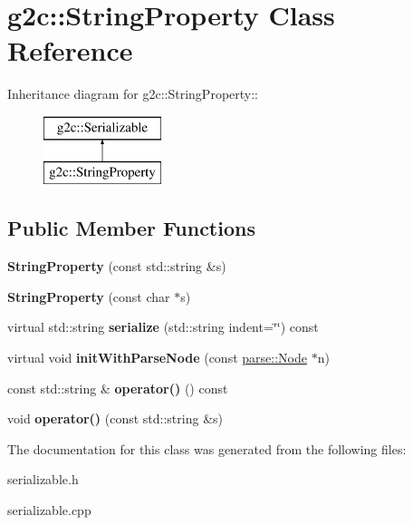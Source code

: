 \hypertarget{classg2c_1_1_string_property}{
\section{g2c::StringProperty Class Reference}
\label{classg2c_1_1_string_property}
}
Inheritance diagram for g2c::StringProperty::\begin{figure}[H]
\begin{center}
\leavevmode
\includegraphics[height=2cm]{classg2c_1_1_string_property}
\end{center}
\end{figure}
\subsection*{Public Member Functions}
\begin{DoxyCompactItemize}
\item 
\hypertarget{classg2c_1_1_string_property_a3bf29c22a3a1f633bc466a8f51810394}{
{\bfseries StringProperty} (const std::string \&s)}
\label{classg2c_1_1_string_property_a3bf29c22a3a1f633bc466a8f51810394}

\item 
\hypertarget{classg2c_1_1_string_property_ac468096772e95ee6cf73c72dc70aadaf}{
{\bfseries StringProperty} (const char $\ast$s)}
\label{classg2c_1_1_string_property_ac468096772e95ee6cf73c72dc70aadaf}

\item 
\hypertarget{classg2c_1_1_string_property_add89345e7f914ccc0a97e80d0c413c72}{
virtual std::string {\bfseries serialize} (std::string indent=\char`\"{}\char`\"{}) const }
\label{classg2c_1_1_string_property_add89345e7f914ccc0a97e80d0c413c72}

\item 
\hypertarget{classg2c_1_1_string_property_aeed9b53e388cdf13d38d7e3d751d5e19}{
virtual void {\bfseries initWithParseNode} (const \hyperlink{classparse_1_1_node}{parse::Node} $\ast$n)}
\label{classg2c_1_1_string_property_aeed9b53e388cdf13d38d7e3d751d5e19}

\item 
\hypertarget{classg2c_1_1_string_property_a570bb8391443ae0a89ee44dbeaa80375}{
const std::string \& {\bfseries operator()} () const }
\label{classg2c_1_1_string_property_a570bb8391443ae0a89ee44dbeaa80375}

\item 
\hypertarget{classg2c_1_1_string_property_a3aebadcdea74130b156886a0a368a7a9}{
void {\bfseries operator()} (const std::string \&s)}
\label{classg2c_1_1_string_property_a3aebadcdea74130b156886a0a368a7a9}

\end{DoxyCompactItemize}


The documentation for this class was generated from the following files:\begin{DoxyCompactItemize}
\item 
serializable.h\item 
serializable.cpp\end{DoxyCompactItemize}
